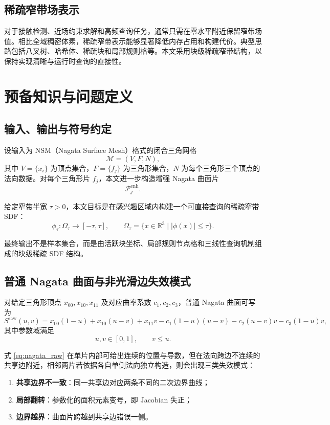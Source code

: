 \documentclass[11pt,a4paper]{ctexart}
\begin{document}
\subsection{稀疏窄带场表示}
对于接触检测、近场约束求解和高频查询任务，通常只需在零水平附近保留窄带场值。相比全域稠密体素，稀疏窄带表示能够显著降低内存占用和构建代价。典型思路包括八叉树、哈希体、稀疏块和局部规则格等。本文采用块级稀疏窄带结构，以保持实现清晰与运行时查询的直接性。

\section{预备知识与问题定义}

\subsection{输入、输出与符号约定}
设输入为 NSM（Nagata Surface Mesh）格式的闭合三角网格
\[
\mathcal{M}=(V,F,N),
\]
其中 $V=\{x_i\}$ 为顶点集合，$F=\{f_j\}$ 为三角形集合，$N$ 为每个三角形三个顶点的法向数据。对每个三角形片 $f_j$，本文进一步构造增强 Nagata 曲面片
\[
\mathcal{P}_j^{\mathrm{enh}}.
\]

给定窄带半宽 $\tau>0$，本文目标是在感兴趣区域内构建一个可直接查询的稀疏窄带 SDF：
\[
\phi_\tau: \Omega_\tau\rightarrow[-\tau,\tau],
\qquad
\Omega_\tau=\{x\in\mathbb{R}^3\mid |\phi(x)|\le \tau\}.
\]

最终输出不是样本集合，而是由活跃块坐标、局部规则节点格和三线性查询机制组成的块级稀疏 SDF 结构。

\subsection{普通 Nagata 曲面与非光滑边失效模式}
对给定三角形顶点 $x_{00},x_{10},x_{11}$ 及对应曲率系数 $c_1,c_2,c_3$，普通 Nagata 曲面可写为
\begin{equation}
S^{\mathrm{raw}}(u,v)=x_{00}(1-u)+x_{10}(u-v)+x_{11}v-c_1(1-u)(u-v)-c_2(u-v)v-c_3(1-u)v,
\label{eq:nagata_raw}
\end{equation}
其中参数域满足
\[
u,v\in[0,1],\qquad v\le u.
\]

式 \eqref{eq:nagata_raw} 在单片内部可给出连续的位置与导数，但在法向跨边不连续的共享边附近，相邻两片若依据各自单侧法向独立构造，则会出现三类失效模式：
\begin{enumerate}[leftmargin=2em]
    \item \textbf{共享边界不一致}：同一共享边对应两条不同的二次边界曲线；
    \item \textbf{局部翻转}：参数化的面积元素变号，即 Jacobian 失正；
    \item \textbf{边界越界}：曲面片跨越到共享边错误一侧。
\end{enumerate}
\end{document}
